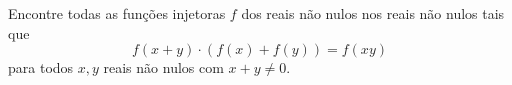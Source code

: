 Encontre todas as funções injetoras $f$ dos reais não nulos nos reais não nulos tais que
$$f(x+y)\cdot(f(x)+f(y))=f(xy)$$
para todos $x,y$ reais não nulos com $x+y \neq 0$.